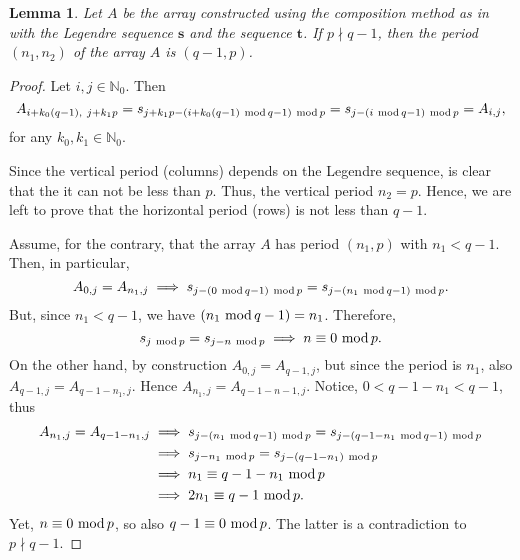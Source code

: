 \documentclass[12pt]{article}
\renewcommand{\mod}{\ \textup{mod}\,}
\newtheorem{lemma}[theorem]{Lemma}
\theoremstyle{definition}
\theoremstyle{definition}
\theoremstyle{definition}
\theoremstyle{plain}
\theoremstyle{plain}
\numberwithin{equation}{section}
\begin{document}
\begin{lemma}\label{lemma1}
Let $A$ be the array constructed using the composition method as in  with the Legendre sequence $\mathbf{s}$ and the sequence $\mathbf{t}$. 
If $p \nmid q-1$, then the period $(n_1,n_2)$ of the array $A$ is $(q-1,p)$.
\end{lemma}
\begin{proof}
    Let $i,j \in \mathbb{N}_0$. Then
    \[
        A_{i+k_0(q-1),\ j + k_1p} = s_{j + k_1p - (i+k_0(q-1) \mod q-1) \mod p} = s_{j - (i \mod q-1)\mod p} = A_{i,j},
    \]
    for any $k_0,k_1 \in \mathbb{N}_0$.
    
    Since the vertical period (columns) depends on the Legendre sequence, is clear that the it can not be less than $p$. 
    Thus, the vertical period $n_2 = p$. 
    Hence, we are left to prove that the horizontal period (rows) is not less than $q-1$.
    
    Assume, for the contrary, that the array $A$ has period $(n_1, p)$ with $n_1 < q-1$.
    Then, in particular,
    \[
        A_{0,j} = A_{n_1,j} \implies s_{j-(0 \mod q-1) \mod p} = s_{j-(n_1 \mod q-1) \mod p}.
    \]
    But, since $n_1 < q-1$, we have $(n_1 \mod q-1) = n_1$. 
    Therefore, 
    \[
        s_{j \mod p} = s_{j-n \mod p} \implies n \equiv 0\mod p.
    \]
    On the other hand, by construction $A_{0,j} = A_{q-1,j}$, but since the period is $n_1$, also $A_{q-1, j} = A_{q-1-n_1,j}$. 
    Hence $A_{n_1,j} = A_{q-1-n-1, j}$. 
    Notice, $0<q-1-n_1<q-1$, thus
    \begin{align*}
        A_{n_1,j} = A_{q-1-n_1, j} &\implies s_{j - (n_1 \mod q-1) \mod p} = s_{j - (q-1-n_1 \mod q-1) \mod p}\\
        &\implies s_{j - n_1 \mod p} = s_{j - (q - 1 - n_1) \mod p}\\
        &\implies n_1 \equiv q - 1 - n_1 \mod p\\
        &\implies 2n_1 \equiv q-1 \mod p.
    \end{align*}
    Yet, $n\equiv 0 \mod p$, so also $q-1 \equiv 0 \mod p$. 
    The latter is a contradiction to $p \nmid q-1$. 
\end{proof}
\end{document}
